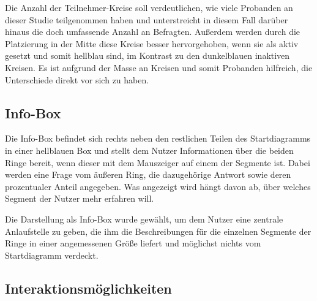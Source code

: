 \documentclass{mi-seminar}
\begin{document}
Die Anzahl der Teilnehmer-Kreise soll verdeutlichen, wie viele Probanden an dieser Studie teilgenommen haben und unterstreicht in diesem Fall darüber hinaus die doch umfassende Anzahl an Befragten. Außerdem werden durch die Platzierung in der Mitte diese Kreise besser hervorgehoben, wenn sie als aktiv gesetzt und somit hellblau sind, im Kontrast zu den dunkelblauen inaktiven Kreisen. Es ist aufgrund der Masse an Kreisen und somit Probanden hilfreich, die Unterschiede direkt vor sich zu haben. 

\subsection{Info-Box}
Die Info-Box befindet sich rechts neben den restlichen Teilen des Startdiagramms in einer hellblauen Box und stellt dem Nutzer Informationen über die beiden Ringe bereit, wenn dieser mit dem Mauszeiger auf einem der Segmente ist. Dabei werden eine Frage vom äußeren Ring, die dazugehörige Antwort sowie deren prozentualer Anteil angegeben. Was angezeigt wird hängt davon ab, über welches Segment der Nutzer mehr erfahren will. 

Die Darstellung als Info-Box wurde gewählt, um dem Nutzer eine zentrale Anlaufstelle zu geben, die ihm die Beschreibungen für die einzelnen Segmente der Ringe in einer angemessenen Größe liefert und möglichst nichts vom Startdiagramm verdeckt. 

\subsection{Interaktionsmöglichkeiten}
\end{document}
